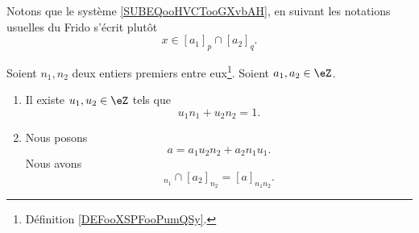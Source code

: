 Notons que le système \eqref{SUBEQooHVCTooGXvbAH}, en suivant les notations usuelles du Frido s'écrit plutôt
\begin{equation}
	x\in [a_1]_p\cap [a_2]_q.
\end{equation}

\begin{lemma}        \label{LemCtUeGA}
	Soient \( n_1,n_2\) deux entiers premiers entre eux\footnote{Définition \ref{DEFooXSPFooPumQSy}.}. Soient \( a_1, a_2\in \eZ\).
	\begin{enumerate}
		\item       \label{ITEMooZVUSooGoplQW}
		      Il existe \( u_1,u_2\in \eZ\) tels que
		      \begin{equation}        \label{EQooIJXOooNEfCBo}
			      u_1n_1+u_2n_2=1.
		      \end{equation}
		\item       \label{ITEMooFMFEooQHNLFc}
		      Nous posons
		      \begin{equation}
			      a=a_1u_2n_2+a_2n_1u_1.
		      \end{equation}
		      Nous avons
		      \begin{equation}
			      [a_1]_{n_1}\cap [a_2]_{n_2}=[a]_{n_1n_2}.
		      \end{equation}
	\end{enumerate}
\end{lemma}


